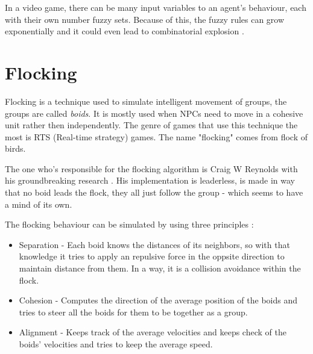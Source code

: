 \documentclass[a4paper, 12pt]{book}
\begin{document}
In a video game, there can be many input variables to an agent's behaviour, each with their own number fuzzy sets. Because of this, the fuzzy rules can grow exponentially and it could even lead to combinatorial explosion \cite{CombinatorialBombing}.

\section{Flocking}

Flocking is a technique used to simulate intelligent movement of groups, the groups are called \emph{boids}. It is mostly used when NPCs need to move in a cohesive unit rather then independently. The genre of games that use this technique the most is RTS (Real-time strategy) games. The name "flocking" comes from flock of birds.

The one who's responsible for the flocking algorithm is Craig W Reynolds with his groundbreaking research \cite{FlocksReynolds}. His implementation is leaderless, is made in way that no boid leads the flock, they all just follow the group - which seems to have a mind of its own.

The flocking behaviour can be simulated by using three principles \cite{FlockingBehaviour}: 
\begin{itemize}
    \item Separation - Each boid knows the distances of its neighbors, so with that knowledge it tries to apply an repulsive force in the oppsite direction to maintain distance from them. In a way, it is a collision avoidance within the flock.
    \item Cohesion - Computes the direction of the average position of the boids and tries to steer all the boids for them to be together as a group.
    \item Alignment - Keeps track of the average velocities and keeps check of the boids' velocities and tries to keep the average speed.
\end{itemize}
\end{document}
